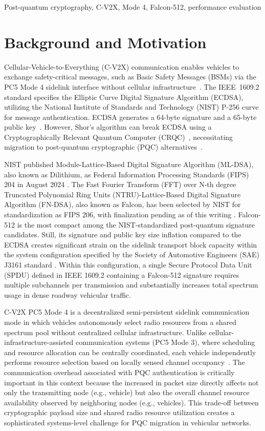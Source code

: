 \documentclass[conference]{IEEEtran}
\begin{document}
\begin{IEEEkeywords}
Post-quantum cryptography, C-V2X, Mode 4, Falcon-512, performance evaluation
\end{IEEEkeywords}

\section{Background and Motivation}

Cellular-Vehicle-to-Everything (C-V2X) communication enables vehicles to exchange safety-critical messages, such as Basic Safety Messages (BSMs) via the PC5 Mode 4 sidelink interface without cellular infrastructure~\cite{3gpp_36213}. The IEEE~1609.2 standard specifies the Elliptic Curve Digital Signature Algorithm (ECDSA), utilizing the National Institute of Standards and Technology (NIST) P-256 curve for message authentication. ECDSA generates a 64-byte signature and a 65-byte public key~\cite{ieee_16092}. However, Shor's algorithm can break ECDSA using a Cryptographically Relevant Quantum Computer (CRQC)~\cite{shor1994algorithms}, necessitating migration to post-quantum cryptographic (PQC) alternatives~\cite{mamun_pqc}.

NIST published Module-Lattice-Based Digital Signature Algorithm (ML-DSA), also known as Dilithium, as Federal Information Processing Standards (FIPS) 204 in August 2024 \cite{fips204}. The Fast Fourier Transform (FFT) over N-th degree Truncated Polynomial Ring Units (NTRU)-Lattice-Based Digital Signature Algorithm (FN-DSA), also known as Falcon, has been selected by NIST for standardization as FIPS 206, with finalization pending as of this writing \cite{nist_pqc_2024}. Falcon-512 is the most compact among the NIST-standardized post-quantum signature candidates. Still, its signature and public key size inflation compared to the ECDSA creates significant strain on the sidelink transport block capacity within the system configuration specified by the Society of Automotive Engineers (SAE) J3161 standard \cite{sae_j3161}. Within this configuration, a single Secure Protocol Data Unit (SPDU) defined in IEEE 1609.2 containing a Falcon-512 signature requires multiple subchannels per transmission and substantially increases total spectrum usage in dense roadway vehicular traffic.

C-V2X PC5 Mode 4 is a decentralized semi-persistent sidelink communication mode in which vehicles autonomously select radio resources from a shared spectrum pool without centralized cellular infrastructure. Unlike cellular-infrastructure-assisted communication systems (PC5 Mode 3), where scheduling and resource allocation can be centrally coordinated, each vehicle independently performs resource selection based on locally sensed channel occupancy~\cite{hajisami2022tutorial}. The communication overhead associated with PQC authentication is critically important in this context because the increased in packet size directly affects not only the transmitting node (e.g., vehicle) but also the overall channel resource availability observed by neighboring nodes (e.g., vehicles). This trade-off between cryptographic payload size and shared radio resource utilization creates a sophisticated systems-level challenge for PQC migration in vehicular networks.
\end{document}
